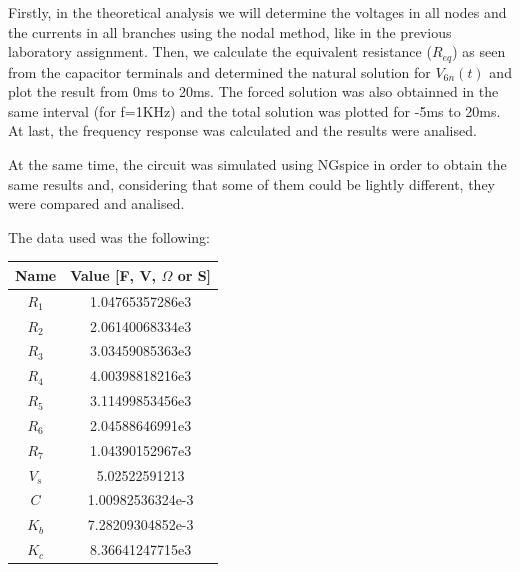 Firstly, in the theoretical analysis we will determine the voltages in all nodes and the currents in all branches using the nodal method, like in the previous laboratory assignment. Then, we calculate the equivalent resistance ($R_{eq}$) as seen from the capacitor terminals and determined the natural solution for $V_{6n}(t)$ and plot the result from 0ms to 20ms. The forced solution was also obtainned in the same interval (for f=1KHz) and the total solution was plotted for -5ms to 20ms. At last, the frequency response was calculated and the results were analised. \par
At the same time, the circuit was simulated using NGspice in order to obtain the same results and, considering that some of them could be lightly different, they were compared and analised.\par
The data used was the following:
\begin{center}
  \begin{tabular}{ | c | c | }
    \hline    
    {\bf Name} & {\bf Value [F, V, $\Omega$ or S]} \\ \hline
    $R_1$ & 1.04765357286e3 \\ \hline 
    $R_2$ & 2.06140068334e3 \\ \hline 
    $R_3$ & 3.03459085363e3 \\ \hline 
    $R_4$ & 4.00398818216e3 \\ \hline 
    $R_5$ & 3.11499853456e3 \\ \hline 
    $R_6$ & 2.04588646991e3 \\ \hline 
    $R_7$ & 1.04390152967e3 \\ \hline 
    $V_s$ & 5.02522591213 \\ \hline 
    $C$ & 1.00982536324e-3 \\ \hline
    $K_b$ & 7.28209304852e-3 \\ \hline
    $K_c$ & 8.36641247715e3 \\ 
    \hline
  \end{tabular}
\end{center}




